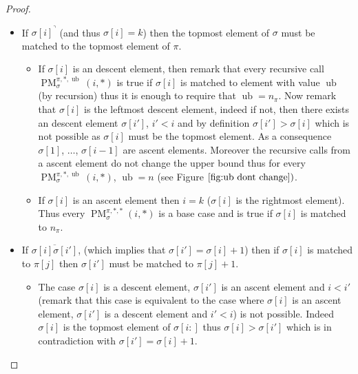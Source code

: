 \documentclass[a4paper]{llncs}
\newcommand{\ptext}{\pi}
\newcommand{\ppattern}{\sigma}
\DeclareMathOperator{\PMa}{PM}
\newcommand{\PM}[6]{\PMa_{{#1}}^{{#2},{#3},{#4}}({#5},{#6})}
\DeclareMathOperator{\ub}{ub}
\begin{document}
\begin{proof}
\begin{itemize}
\begin{itemize}
	\end{itemize}




	\item If ${\ppattern[i]}^\urcorner$ (and thus $\sigma[i]=k$) then the topmost element of $\ppattern$ must be matched to the topmost element of $\ptext$.
	\begin{itemize}

		\item If $\sigma[i]$ is an descent element, then remark that 
		every recursive call \\ $\PM{\sigma}{\ptext}{*}{\ub}{i}{*}$ is true if $\sigma[i]$ is matched to element with value $\ub$ (by recursion) thus it is enough to require that $\ub=n_{\ptext}$.
		Now remark that $\sigma[i]$ is the leftmost descent element, indeed if not, then there exists an descent element $\sigma[i']$, $i'<i$ and by definition $\sigma[i']>\sigma[i]$ which is not possible as $\sigma[i]$ must be the topmost element.
		As a consequence $\sigma[1]$, $\ldots$, $\sigma[i-1]$ are ascent elements.
		Moreover the recursive calls from a ascent element do not change the upper bound
		thus for every $\PM{\sigma}{\ptext}{*}{\ub}{i}{*}$, $\ub=n$ (see Figure $\ref{fig:ub dont change})$. 	
		
		
		\item If $\sigma[i]$ is an ascent element then $i=k$ ($\sigma[i]$ is the rightmost element). Thus every $\PM{\sigma}{\ptext}{*}{*}{i}{*}$ is a base case and is true if $\sigma[i]$ is matched to $n_{\ptext}$.

	\end{itemize}



	\item  If $\overline{\ppattern[i]\ppattern[i']}$,  (which implies that $\ppattern[i']=\ppattern[i]+1$) then if $\ppattern[i]$ is matched to $\ptext[j]$ then $\ppattern[i']$ must be matched to $\ptext[j]+1$.

		\begin{itemize}

			\item The case $\ppattern[i]$ is a descent element, $\ppattern[i']$ is an ascent element and $i<i'$ (remark that this case is equivalent to the case where  $\ppattern[i]$ is an ascent element, $\ppattern[i']$ is a descent element and $i'<i$) is not possible. 
			Indeed $\ppattern[i]$ is the topmost element of $\ppattern[i:]$ thus $\ppattern[i] > \ppattern[i']$ which is in contradiction with 
			$\ppattern[i']=\ppattern[i]+1$. 
			

\end{itemize}
\end{itemize}
\end{proof}
\end{document}
